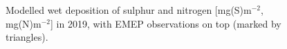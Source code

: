 \begin{figure}[H]
 \caption{Modelled wet deposition of sulphur and nitrogen [mg(S)m$^{-2}$, mg(N)m$^{-2}$] in 2019, with EMEP observations on top (marked by triangles).}
\label{wdeps}
\end{figure}

\clearpage
\renewcommand\bibname{References}      %

